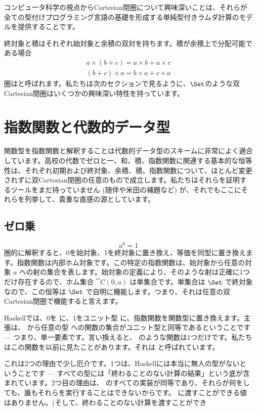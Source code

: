 コンピュータ科学の視点からCartesian閉圏について興味深いことは、それらが全ての型付けプログラミング言語の基礎を形成する単純型付きラムダ計算のモデルを提供することです。

終対象と積はそれぞれ始対象と余積の双対を持ちます。積が余積上で分配可能である場合
\begin{gather*}
  a \times (b + c) = a \times b + a \times c \\
  (b + c) \times a = b \times a + c \times a
\end{gather*}
圏はと呼ばれます。私たちは次のセクションで見るように、$\Set$のような双Cartesian閉圏はいくつかの興味深い特性を持っています。

\section{指数関数と代数的データ型}

関数型を指数関数と解釈することは代数的データ型のスキームに非常によく適合しています。高校の代数でゼロと一、和、積、指数関数に関連する基本的な恒等性は、それぞれ初期および終対象、余積、積、指数関数について、ほとんど変更されずに双Cartesian閉圏の任意のもので成立します。私たちはそれらを証明するツールをまだ持っていません (随伴や米田の補題など) が、それでもここにそれらを列挙して、貴重な直感の源としています。

\subsection{ゼロ乗}

\[a^{0} = 1\]
圏的に解釈すると、0を始対象、1を終対象に置き換え、等価を同型に置き換えます。指数関数は内部ホム対象です。この特定の指数関数は、始対象から任意の対象 $a$ への射の集合を表します。始対象の定義により、そのような射は正確に1つだけ存在するので、ホム集合 $\cat{C}(0, a)$ は単集合です。単集合は $\Set$ で終対象なので、この恒等は $\Set$ で自明に機能します。つまり、それは任意の双Cartesian閉圏で機能すると言えます。

Haskellでは、0を  に、1をユニット型 \code{()} に、指数関数を関数型に置き換えます。主張は、 から任意の型  への関数の集合がユニット型と同等であるということです --- つまり、単一要素です。言い換えると、 のような関数は1つだけです。私たちはこの関数を以前に見たことがあります。それは  と呼ばれています。

これは2つの理由で少し厄介です。1つは、Haskellには本当に無人の型がないということです --- すべての型には「終わることのない計算の結果」という底が含まれています。2つ目の理由は、 のすべての実装が同等であり、それらが何をしても、誰もそれらを実行することはできないからです。  に渡すことができる値はありません。(そして、終わることのない計算を渡すことができ

